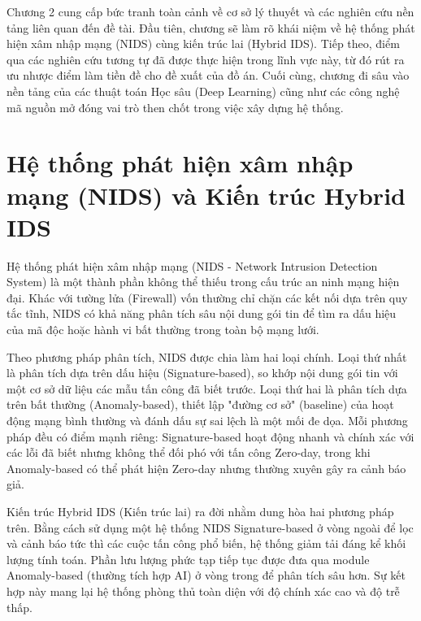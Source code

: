 \documentclass[../DoAn.tex]{subfiles}
\begin{document}
Chương 2 cung cấp bức tranh toàn cảnh về cơ sở lý thuyết và các nghiên cứu nền tảng liên quan đến đề tài. Đầu tiên, chương sẽ làm rõ khái niệm về hệ thống phát hiện xâm nhập mạng (NIDS) cùng kiến trúc lai (Hybrid IDS). Tiếp theo, điểm qua các nghiên cứu tương tự đã được thực hiện trong lĩnh vực này, từ đó rút ra ưu nhược điểm làm tiền đề cho đề xuất của đồ án. Cuối cùng, chương đi sâu vào nền tảng của các thuật toán Học sâu (Deep Learning) cũng như các công nghệ mã nguồn mở đóng vai trò then chốt trong việc xây dựng hệ thống.

\section{Hệ thống phát hiện xâm nhập mạng (NIDS) và Kiến trúc Hybrid IDS}
Hệ thống phát hiện xâm nhập mạng (NIDS - Network Intrusion Detection System) là một thành phần không thể thiếu trong cấu trúc an ninh mạng hiện đại. Khác với tường lửa (Firewall) vốn thường chỉ chặn các kết nối dựa trên quy tắc tĩnh, NIDS có khả năng phân tích sâu nội dung gói tin để tìm ra dấu hiệu của mã độc hoặc hành vi bất thường trong toàn bộ mạng lưới.

Theo phương pháp phân tích, NIDS được chia làm hai loại chính. Loại thứ nhất là phân tích dựa trên dấu hiệu (Signature-based), so khớp nội dung gói tin với một cơ sở dữ liệu các mẫu tấn công đã biết trước. Loại thứ hai là phân tích dựa trên bất thường (Anomaly-based), thiết lập "đường cơ sở" (baseline) của hoạt động mạng bình thường và đánh dấu sự sai lệch là một mối đe dọa. Mỗi phương pháp đều có điểm mạnh riêng: Signature-based hoạt động nhanh và chính xác với các lỗi đã biết nhưng không thể đối phó với tấn công Zero-day, trong khi Anomaly-based có thể phát hiện Zero-day nhưng thường xuyên gây ra cảnh báo giả.

Kiến trúc Hybrid IDS (Kiến trúc lai) ra đời nhằm dung hòa hai phương pháp trên. Bằng cách sử dụng một hệ thống NIDS Signature-based ở vòng ngoài để lọc và cảnh báo tức thì các cuộc tấn công phổ biến, hệ thống giảm tải đáng kể khối lượng tính toán. Phần lưu lượng phức tạp tiếp tục được đưa qua module Anomaly-based (thường tích hợp AI) ở vòng trong để phân tích sâu hơn. Sự kết hợp này mang lại hệ thống phòng thủ toàn diện với độ chính xác cao và độ trễ thấp.
\end{document}
